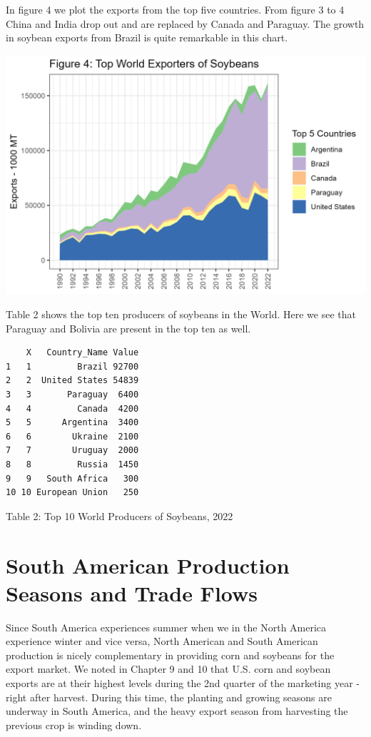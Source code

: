 \documentclass[
  letterpaper,
  DIV=11,
  numbers=noendperiod]{scrreprt}
\begin{document}
In figure 4 we plot the exports from the top five countries. From figure
3 to 4 China and India drop out and are replaced by Canada and Paraguay.
The growth in soybean exports from Brazil is quite remarkable in this
chart.

\includegraphics{assets/SouthAmericanProd_TopExporterSoy.png}

Table 2 shows the top ten producers of soybeans in the World. Here we
see that Paraguay and Bolivia are present in the top ten as well.

\begin{verbatim}
    X   Country_Name Value
1   1         Brazil 92700
2   2  United States 54839
3   3       Paraguay  6400
4   4         Canada  4200
5   5      Argentina  3400
6   6        Ukraine  2100
7   7        Uruguay  2000
8   8         Russia  1450
9   9   South Africa   300
10 10 European Union   250
\end{verbatim}

Table 2: Top 10 World Producers of Soybeans, 2022

\section{South American Production Seasons and Trade
Flows}\label{south-american-production-seasons-and-trade-flows}

Since South America experiences summer when we in the North America
experience winter and vice versa, North American and South American
production is nicely complementary in providing corn and soybeans for
the export market. We noted in Chapter 9 and 10 that U.S. corn and
soybean exports are at their highest levels during the 2nd quarter of
the marketing year - right after harvest. During this time, the planting
and growing seasons are underway in South America, and the heavy export
season from harvesting the previous crop is winding down.
\end{document}
